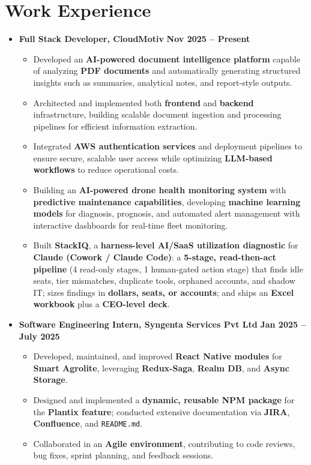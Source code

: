 \documentclass{article}
\begin{document}
\vspace{10pt}
\section{Work Experience}
\vspace{4pt}
\begin{itemize}
  \setlength\itemsep{1pt} %
    \item \textbf{Full Stack Developer, CloudMotiv} \hfill \textbf{Nov 2025 -- Present}
  \begin{itemize}
    \setlength\itemsep{0pt}
    \item Developed an \textbf{AI-powered document intelligence platform} capable of analyzing \textbf{PDF documents} and automatically generating structured insights such as summaries, analytical notes, and report-style outputs.
    \item Architected and implemented both \textbf{frontend} and \textbf{backend} infrastructure, building scalable document ingestion and processing pipelines for efficient information extraction.
    \item Integrated \textbf{AWS authentication services} and deployment pipelines to ensure secure, scalable user access while optimizing \textbf{LLM-based workflows} to reduce operational costs.
    \item Building an \textbf{AI-powered drone health monitoring system} with \textbf{predictive maintenance capabilities}, developing \textbf{machine learning models} for diagnosis, prognosis, and automated alert management with interactive dashboards for real-time fleet monitoring.
    \item Built \textbf{StackIQ}, a \textbf{harness-level AI/SaaS utilization diagnostic} for \textbf{Claude (Cowork / Claude Code)}: a \textbf{5-stage, read-then-act pipeline} (4 read-only stages, 1 human-gated action stage) that finds idle seats, tier mismatches, duplicate tools, orphaned accounts, and shadow IT; sizes findings in \textbf{dollars, seats, or accounts}; and ships an \textbf{Excel workbook} plus a \textbf{CEO-level deck}.
\end{itemize}
  \item \textbf{Software Engineering Intern, Syngenta Services Pvt Ltd} \hfill \textbf{Jan 2025 -- July 2025}
  \begin{itemize}
    \setlength\itemsep{0pt} %
    \item Developed, maintained, and improved \textbf{React Native modules} for \textbf{Smart Agrolite}, leveraging \textbf{Redux-Saga}, \textbf{Realm DB}, and \textbf{Async Storage}.
    \item Designed and implemented a \textbf{dynamic, reusable NPM package} for the \textbf{Plantix feature}; conducted extensive documentation via \textbf{JIRA}, \textbf{Confluence}, and \texttt{README.md}.
    \item Collaborated in an \textbf{Agile environment}, contributing to code reviews, bug fixes, sprint planning, and feedback sessions.
  \end{itemize}


\end{itemize}
\end{document}
